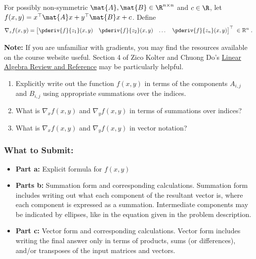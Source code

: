 \documentclass{article}
\begin{document}
\begin{aprob} \label{prob:sumvec}
    For possibly non-symmetric $\mat{A}, \mat{B} \in \R^{n \times n}$ and $c \in \R$, let $f(x, y) = x^\top \mat{A} x + y^\top \mat{B} x + c$. Define
    $$\nabla_z f(x,y) = \begin{bmatrix}
        \pderiv{f}{z_1}(x,y) & \pderiv{f}{z_2}(x,y) & \dots & \pderiv{f}{z_n}(x,y)
    \end{bmatrix}^\top \; \in{\mathbb R}^{n}\;.$$  

    \textbf{Note:} If you are unfamiliar with gradients, you may find the resources available on the course website useful. Section 4 of Zico Kolter and Chuong Do's \href{http://www.cs.cmu.edu/~zkolter/course/15-884/linalg-review.pdf}{Linear Algebra Review and Reference} may be particularly helpful.\\
    
    \begin{enumerate}
        \item {} Explicitly write out the function $f(x, y)$ in terms of the components $A_{i,j}$ and $B_{i,j}$ using appropriate summations over the indices.
        \item {} What is $\nabla_x f(x,y)$ and $\nabla_y f(x,y)$  in terms of summations over indices?
        \item {} What is $\nabla_x f(x,y)$ and $\nabla_y f(x,y)$ in vector notation?
    \end{enumerate}
    \subsubsection*{What to Submit:}
    \begin{itemize}
        \item \textbf{Part a:} Explicit formula for $f(x, y)$
        \item \textbf{Parts b:} Summation form and corresponding calculations. Summation form includes writing out what each component of the resultant vector is, where each component is expressed as a summation. Intermediate components may be indicated by ellipses, like in the equation given in the problem description.
        \item \textbf{Part c:} Vector form and corresponding calculations. Vector form includes writing the final answer only in terms of products, sums (or differences), and/or transposes of the input matrices and vectors.
    \end{itemize}
\end{aprob}
\end{document}
